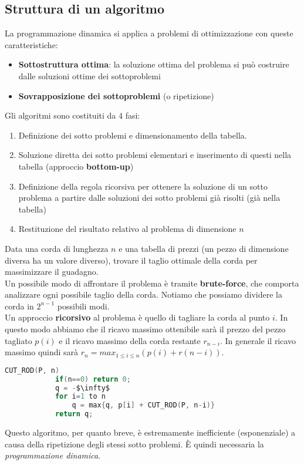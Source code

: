 \subsection{Struttura di un algoritmo }
La programmazione dinamica si applica a problemi di ottimizzazione con queste caratteristiche:
\begin{itemize}
	\item \textbf{Sottostruttura ottima}: la soluzione ottima del problema si può costruire dalle soluzioni ottime dei sottoproblemi
	\item \textbf{Sovrapposizione dei sottoproblemi} (o ripetizione)
\end{itemize}
Gli algoritmi sono costituiti da 4 fasi:
\begin{enumerate}
	\item Definizione dei sotto problemi e dimensionamento della tabella.
	\item Soluzione diretta dei sotto problemi elementari e inserimento di questi nella tabella (approccio \textbf{bottom-up})
	\item Definizione della regola ricorsiva per ottenere la soluzione di un sotto problema a partire dalle soluzioni dei sotto problemi già risolti (già nella tabella)
	\item Restituzione del risultato relativo al problema di dimensione $n$
\end{enumerate}

\begin{example}
	Data una corda di lunghezza $n$ e una tabella di prezzi (un pezzo di dimensione diversa ha un valore diverso), trovare il taglio ottimale della corda per massimizzare il guadagno.\\
	Un possibile modo di affrontare il problema è tramite \textbf{brute-force}, che comporta analizzare ogni possibile taglio della corda. Notiamo che possiamo dividere la corda in $2^{n -1}$ possibili modi.\\
	Un approccio \textbf{ricorsivo} al problema è quello di tagliare la corda al punto $i$. In questo modo abbiamo che il ricavo massimo ottenibile sarà il prezzo del pezzo tagliato $p(i)$ e il ricavo massimo della corda restante $r_{n-i}$. In generale il ricavo massimo quindi sarà $r_n = max_{1 \leq i \leq n}(p(i)+r(n-i))$.
	\begin{lstlisting}[language=C, caption=Taglio della corda, mathescape=true]
		CUT_ROD(P, n)
			if(n==0) return 0;
			q = -$\infty$
			for i=1 to n
				q = max{q, p[i] + CUT_ROD(P, n-i)}
			return q;
	\end{lstlisting}
	Questo algoritmo, per quanto breve, è estremamente inefficiente (esponenziale) a causa della ripetizione degli stessi sotto problemi. È quindi necessaria la \emph{programmazione dinamica}.
\end{example}

